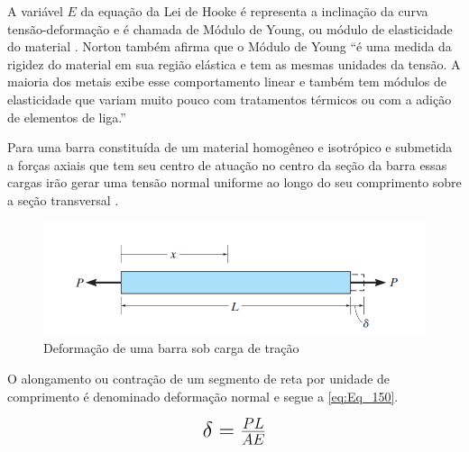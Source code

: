 \hfill

A variável $E$ da equação da Lei de Hooke é representa a inclinação da curva tensão-deformação e é chamada de Módulo de Young, ou módulo de elasticidade do
material \autocite{Norton2011}. Norton também afirma que o Módulo de Young “é uma medida da rigidez do material em sua região elástica e tem as mesmas unidades da tensão.
A maioria dos metais exibe esse comportamento linear e também tem módulos de elasticidade que variam muito pouco com tratamentos térmicos ou com a adição de elementos de liga.”

Para uma barra constituída de um material homogêneo e isotrópico e submetida a forças axiais que tem seu centro de atuação no centro da seção da barra essas cargas
irão gerar uma tensão normal uniforme ao longo do seu comprimento sobre a seção transversal \autocite{Hibbeler2010}.

\begin{figure}[htb]
	\caption{\label{fig:1030} Deformação de uma barra sob carga de tração}
	\begin{center}
		\includegraphics[width=\textwidth]{pictures/1030.png}
	\end{center}
\end{figure}

O alongamento ou contração de um segmento de reta por unidade de comprimento é denominado deformação normal e segue a \autoref{eq:Eq_150}.

\begin{equation}\label{eq:Eq_150}%
\mbox{\fontsize{17.28}{21.6}\selectfont\( %
\delta = \frac{PL}{AE}
\)} %
\end{equation}

%
%
%
%

\hfill


